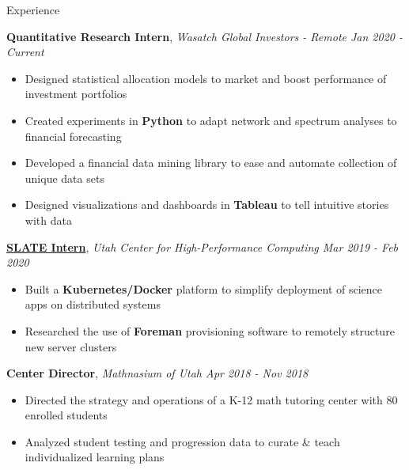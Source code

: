 \documentclass{resume/resume}
\begin{document}
\begin{rSection}{Experience}

    {\bf Quantitative Research Intern}, {\em Wasatch Global Investors - Remote \hfill Jan 2020 - Current}
    \vspace{-6pt}
    \begin{itemize}[nosep]
        \item Designed statistical allocation models to market and boost performance of investment portfolios
        \item Created experiments in {\bf Python} to adapt network and spectrum analyses to financial forecasting
        \item Developed a financial data mining library to ease and automate collection of unique data sets
        \item Designed visualizations and dashboards in {\bf Tableau} to tell intuitive stories with data
    \end{itemize}

    {\bf \href{https://slateci.io/}{SLATE Intern}}, {\em Utah Center for High-Performance Computing \hfill Mar 2019 - Feb 2020}
    \vspace{-6pt}
    \begin{itemize}[nosep]
        \item Built a {\bf Kubernetes/Docker} platform to simplify deployment of science apps on distributed systems
        \item Researched the use of {\bf Foreman} provisioning software to remotely structure new server clusters
    \end{itemize}
    
    {\bf Center Director}, {\em Mathnasium of Utah \hfill Apr 2018 - Nov 2018}
    \vspace{-6pt}
    \begin{itemize}[nosep]
        \item Directed the strategy and operations of a K-12 math tutoring center with 80 enrolled students
        \item Analyzed student testing and progression data to curate \& teach individualized learning plans
    \end{itemize}
    

\end{rSection}
\end{document}
